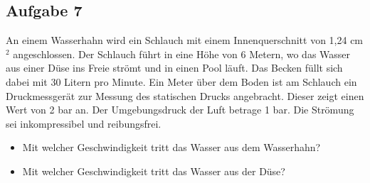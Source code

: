 \documentclass[a4paper,11pt]{article}
\newif\ifshowme
\begin{document}
\begin{marginfigure}[+2cm]
	
\ifshowme
\antwort{
Zunächst ursprünglichen Füllstand des Kanisters berechnen:
\begin{align*}	
t &= \sqrt{\frac{2}{g}} \cdot \frac{A_1}{A_2} \cdot \left(\sqrt{h_{\alpha}} - \sqrt{h_w} \right) \\
t &= \sqrt{\frac{2}{g}} \cdot \frac{A_1}{A_2} \cdot \sqrt{h_{\alpha}} - \sqrt{\frac{2}{g}} \cdot \frac{A_1}{A_2} \cdot  \sqrt{h_w} \\ \\
\sqrt{h_{\alpha}} &= \frac{t + \sqrt{\frac{2}{g}} \cdot \frac{A_1}{A_2} \cdot  \sqrt{h_w}}{\sqrt{\frac{2}{g}} \cdot \frac{A_1}{A_2}}\\
h_{\alpha} &= \left( \frac{t + \sqrt{\frac{2}{g}} \cdot \frac{A_1}{A_2} \cdot  \sqrt{h_w}}{\sqrt{\frac{2}{g}} \cdot \frac{A_1}{A_2}} \right)^2 \\
h_{\alpha} &= \left( \frac{120~\text{s} + \sqrt{\frac{2}{9,81~\text{m/s}^2}} \cdot \frac{(1~\text{m})^2}{(0,05~\text{m})^2} \cdot  \sqrt{0,2~\text{m}}}{\sqrt{\frac{2}{9,81~\text{m/s}^2}} \cdot \frac{(1~\text{m})^2}{(0,05~\text{m})^2}} \right)^2 \\
&\approx 1,236~\text{m}
\end{align*}
\marginnote[]{\fplmt{Anmerkung:} Hier habe ich beim Einsetzen der Werte nicht die Fläche A genommen, sondern das Verhältnis der Durchmesser zum Quadrat (ähnlich wie in Aufgabe 2)}[-2cm]
\pp

Über den Füllstand das Volumen berechnen:
\begin{align*}
V &= \pi \cdot (0,5~\text{m})^2 \cdot (1,236 - 0,2~\text{m}) \\
&= 0,814~\text{m}^3 \\
&= 814 ~\text{dm}^3 \\
&= 814~\text{L}
\end{align*}
}
\pagebreak
\else
\fi


\subsection*{Aufgabe 7}
An einem Wasserhahn wird ein Schlauch mit einem Innenquerschnitt von 1,24 cm$^2$  angeschlossen. Der Schlauch führt in eine Höhe von 6 Metern, wo das Wasser aus einer Düse ins Freie strömt und in einen Pool läuft. Das Becken füllt sich dabei mit 30 Litern pro Minute. Ein Meter über dem Boden ist am Schlauch ein Druckmessgerät zur Messung des statischen Drucks angebracht. Dieser zeigt einen Wert von 2 bar an. Der Umgebungsdruck der Luft betrage 1 bar. Die Strömung sei inkompressibel und reibungsfrei. 
\begin{itemize}
\item Mit welcher Geschwindigkeit tritt das Wasser aus dem Wasserhahn?
\item Mit welcher Geschwindigkeit tritt das Wasser aus der Düse?
\end{itemize}



\end{marginfigure}
\end{document}
